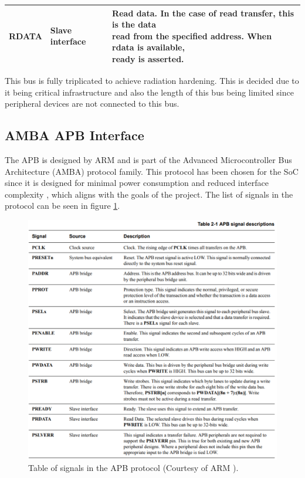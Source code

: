 \begin{table}[H]
\begin{tabular}{lll}
RDATA & Slave interface &  \makecell[l]{Read data. In the case of read transfer, this is the data \\ read from the specified address. When rdata is available, \\ ready is asserted.} \\ \hline
\end{tabular}%

\end{table}

This bus is fully triplicated to achieve radiation hardening. This is decided due to it being critical infrastructure and also the length of this bus being limited since peripheral devices are not connected to this bus. 

\subsection{AMBA APB Interface}
\label{apb_if}
The APB is designed by ARM and is part of the Advanced Microcontroller Bus Architecture (AMBA) protocol family. This protocol has been chosen for the SoC since it is designed for minimal power consumption and reduced interface complexity \cite{apbReference}, which aligns with the goals of the project. The list of signals in the protocol can be seen in figure \ref{fig:apb_signals}.

\begin{figure}[H]
    \centering
    \includegraphics[width=\linewidth]{subfiles/imgs/IP_Blocks_Pics/apb_signals.pdf}
    \caption{Table of signals in the APB protocol (Courtesy of ARM \cite{apbReference}).}
    \label{fig:apb_signals}
\end{figure}

